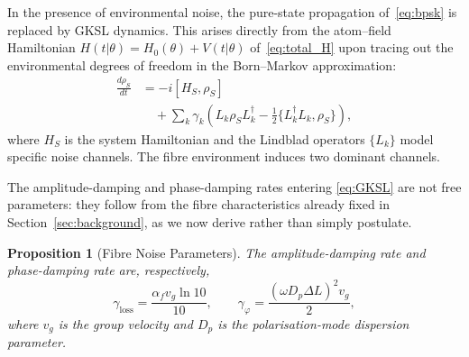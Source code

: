 \documentclass[journal,twocolumn]{IEEEtran}
\theoremstyle{definition}
\theoremstyle{plain}
\newtheorem{proposition}[theorem]{Proposition}
\newcommand{\alphaf}{\alpha_{f}}
\begin{document}
In the presence of environmental noise, the pure-state propagation
of~\eqref{eq:bpsk} is replaced by GKSL dynamics.  This arises
directly from the atom--field Hamiltonian $H(t|\theta) = H_0(\theta)
+ V(t|\theta)$ of~\eqref{eq:total_H} upon tracing out the
environmental degrees of freedom in the Born--Markov approximation:
\begin{align}
  \frac{d\rho_S}{dt} &= -i[H_S, \rho_S] \nonumber\\
  &\quad + \sum_k \gamma_k \!\left(L_k \rho_S L_k^\dagger
    - \tfrac{1}{2}\{L_k^\dagger L_k, \rho_S\}\right),
  \label{eq:GKSL}
\end{align}
where $H_S$ is the system Hamiltonian and the Lindblad operators
$\{L_k\}$ model specific noise channels.  The fibre environment
induces two dominant channels.

The amplitude-damping and phase-damping rates entering
\eqref{eq:GKSL} are not free parameters: they follow from the fibre
characteristics already fixed in Section~\ref{sec:background}, as we
now derive rather than simply postulate.

\begin{proposition}[Fibre Noise Parameters]
\label{prop:noise_rates}
The amplitude-damping rate and phase-damping rate are, respectively,
\begin{equation}
  \gamma_{\mathrm{loss}} = \frac{\alphaf v_g \ln 10}{10}, \qquad
  \gamma_\varphi = \frac{(\omega D_p \Delta L)^2 v_g}{2},
  \label{eq:noise_rates}
\end{equation}
where $v_g$ is the group velocity and $D_p$ is the
polarisation-mode dispersion parameter.
\end{proposition}
\end{document}
